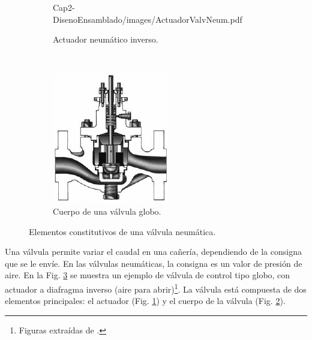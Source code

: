 \begin{figure}[t]
\begin{subfigure}[b]{0.37\textwidth}
	{Cap2-DisenoEnsamblado/images/ActuadorValvNeum.pdf}
                \caption{Actuador neumático inverso.}
                \label{fig:actuadorValv}
        \end{subfigure}%
        ~
        \begin{subfigure}[b]{0.37\textwidth}
\includegraphics[width=\textwidth]{Cap2-DisenoEnsamblado/images/ValvGlob.pdf}
                \caption{Cuerpo de una válvula globo.}
                \label{fig:cuerpoValv}
        \end{subfigure}
        \caption{Elementos constitutivos de una válvula neumática.}
        \label{fig:elementosValv}
\end{figure}

Una válvula permite variar el caudal en una cañería, dependiendo de la consigna
que se le envíe.
En las válvulas neumáticas, la consigna es un valor de presión de aire.
En la Fig. \ref{fig:elementosValv} se muestra un ejemplo de válvula de control
tipo globo, con actuador a diafragma inverso (aire para
abrir)\footnote{Figuras extraídas de \cite{bib:controlValveHandbook}.}.
La válvula está compuesta de dos elementos principales: el actuador
(Fig. \ref{fig:actuadorValv}) y el cuerpo de la válvula (Fig.
\ref{fig:cuerpoValv}).

